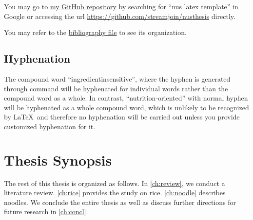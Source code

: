 You may go to \href{https://github.com/streamjoin/nusthesis}{my GitHub repository} by searching for ``nus latex template'' in Google or accessing the url  \url{https://github.com/streamjoin/nusthesis} directly. 

You may refer to the \href{run:./src/references.bib}{bibliography file} to see its organization.  

\subsection{Hyphenation}

The compound word ``ingredient\zz{}insensitive'', where the hyphen is generated through command \CMD{\zz{}} will be hyphenated for individual words rather than the compound word as a whole. 
In contrast, ``nutrition-oriented'' with normal hyphen will be hyphenated as a whole compound word, which is unlikely to be recognized by \LaTeX\ and therefore no hyphenation will be carried out unless you provide customized hyphenation for it. 

\section{Thesis Synopsis}

The rest of this thesis is organized as follows. 
In \autoref{ch:review}, we conduct a literature review. 
\autoref{ch:rice} provides the study on rice. 
\autoref{ch:noodle} describes noodles. 
We conclude the entire thesis as well as discuss further directions for future research in \autoref{ch:concl}.

